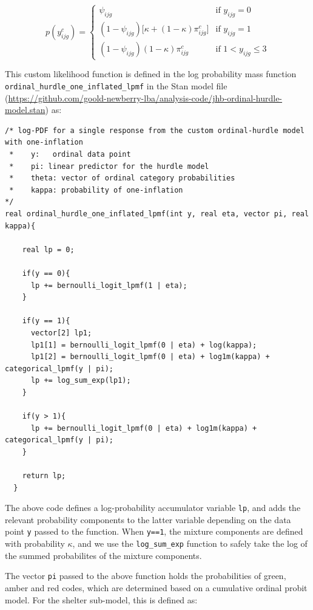\documentclass[12pt]{article}
\begin{document}
\begin{equation}
  p(y_{ijg}^{c}) =
  \begin{cases}
      \psi_{ijg} & \text{if } y_{ijg} = 0 \\
      (1-\psi_{ijg})\big[\kappa + (1-\kappa)\pi_{ijg}^c\big]
      & \text{if } y_{ijg} = 1 \\
      (1-\psi_{ijg})(1-\kappa)\pi_{ijg}^c
      & \text{if } 1 < y_{ijg} \leq 3
  \end{cases}
  \label{eq_mixture}
\end{equation}

This custom likelihood function is defined in the log probability mass function \\\texttt{ordinal\_hurdle\_one\_inflated\_lpmf} in the Stan model file (\href{https://github.com/goold-newberry-lba/analysis-code/jhb-ordinal-hurdle-model.stan}{https://github.com/goold-newberry-lba/analysis-code/jhb-ordinal-hurdle-model.stan}) as:

\begin{lstlisting}
/* log-PDF for a single response from the custom ordinal-hurdle model with one-inflation
 *    y:   ordinal data point
 *    pi: linear predictor for the hurdle model
 *    theta: vector of ordinal category probabilities
 *    kappa: probability of one-inflation
*/
real ordinal_hurdle_one_inflated_lpmf(int y, real eta, vector pi, real kappa){

    real lp = 0;

    if(y == 0){
      lp += bernoulli_logit_lpmf(1 | eta);
    }

    if(y == 1){
      vector[2] lp1;
      lp1[1] = bernoulli_logit_lpmf(0 | eta) + log(kappa);
      lp1[2] = bernoulli_logit_lpmf(0 | eta) + log1m(kappa) + categorical_lpmf(y | pi);
      lp += log_sum_exp(lp1);
    }

    if(y > 1){
      lp += bernoulli_logit_lpmf(0 | eta) + log1m(kappa) + categorical_lpmf(y | pi);
    }

    return lp;
  }
\end{lstlisting}
%
The above code defines a log-probability accumulator variable \texttt{lp}, and adds the relevant probability components to the latter variable depending on the data point \texttt{y} passed to the function. When \texttt{y==1}, the mixture components are defined with probability $\kappa$, and we use the \texttt{log\_sum\_exp} function to safely take the log of the summed probabilites of the mixture components.

The vector \texttt{pi} passed to the above function holds the probabilities of green, amber and red codes, which are determined based on a cumulative ordinal probit model. For the shelter sub-model, this is defined as:
\end{document}

